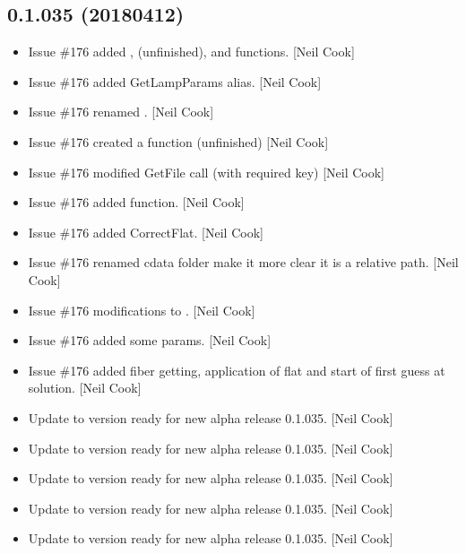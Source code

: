 \documentclass[a4paper,10pt,english]{report}
\begin{document}
\subsection{0.1.035 (2018\sphinxhyphen{}04\sphinxhyphen{}12)}
\label{\detokenize{misc/changelog:id483}}\begin{itemize}
\item {} 
Issue \#176 \sphinxhyphen{} added , 
(unfinished), and  functions. {[}Neil Cook{]}

\item {} 
Issue \#176 \sphinxhyphen{} added GetLampParams alias. {[}Neil Cook{]}

\item {} 
Issue \#176 \sphinxhyphen{} renamed . {[}Neil Cook{]}

\item {} 
Issue \#176 \sphinxhyphen{} created a  function (unfinished) {[}Neil
Cook{]}

\item {} 
Issue \#176 \sphinxhyphen{} modified GetFile call (with required key) {[}Neil Cook{]}

\item {} 
Issue \#176 \sphinxhyphen{} added  function. {[}Neil Cook{]}

\item {} 
Issue \#176 \sphinxhyphen{} added CorrectFlat. {[}Neil Cook{]}

\item {} 
Issue \#176 \sphinxhyphen{} renamed cdata folder \sphinxhyphen{} make it more clear it is a
relative path. {[}Neil Cook{]}

\item {} 
Issue \#176 \sphinxhyphen{} modifications to . {[}Neil Cook{]}

\item {} 
Issue \#176 \sphinxhyphen{} added some  params. {[}Neil Cook{]}

\item {} 
Issue \#176 \sphinxhyphen{} added fiber getting, application of flat and start of
first guess at solution. {[}Neil Cook{]}

\item {} 
Update to version ready for new alpha release 0.1.035. {[}Neil Cook{]}

\item {} 
Update to version ready for new alpha release 0.1.035. {[}Neil Cook{]}

\item {} 
Update to version ready for new alpha release 0.1.035. {[}Neil Cook{]}

\item {} 
Update to version ready for new alpha release 0.1.035. {[}Neil Cook{]}

\item {} 
Update to version ready for new alpha release 0.1.035. {[}Neil Cook{]}

\end{itemize}
\end{document}
